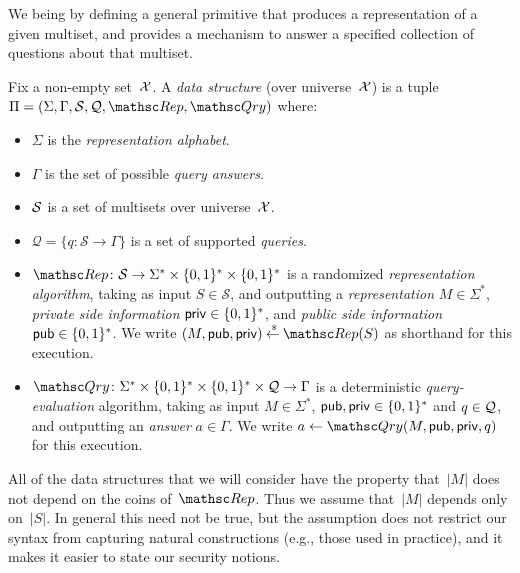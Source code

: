   We being by defining a general primitive
that produces a representation of a given multiset, and provides a
mechanism to answer a specified collection of questions about that
multiset. 
\begin{definition} \rm
Fix a non-empty set~${\cal X}$. A \emph{data structure} (over universe~${\cal X}$)
is a tuple $\setprim=(\Sigma,\Gamma,\calS,\calQ,\Rep, \Qry)$ where:
\begin{itemize}
\item $\Sigma$ is the \emph{representation alphabet}.
\item $\Gamma$ is the set of possible \emph{query answers}.
\item ${\cal S}$ is a set  of multisets over universe~${\cal X}$.
\item $\mathcal{Q}=\{q \colon \mathcal{S} \to \Gamma\}$ is a set
    of supported \emph{queries}.
\item $\Rep \colon \mathcal{S} \to \Sigma^* \times \bits^*
    \times \bits^*$ is a randomized \emph{representation
    algorithm}, taking as input $S \in \mathcal{S}$, and
    outputting a \emph{representation} $M \in \Sigma^*$,
    \emph{private side information} ${\sf priv} \in \{0,1\}^*$, and
    \emph{public side information} ${\sf pub} \in \{0,1\}^*$.  We write
    $(M,\pubaux,\privaux) \getsr \Rep(S)$ as shorthand for this execution.
\item $\Qry\colon \Sigma^* \times \bits^* \times \bits^* \times \calQ \to
    \Gamma$ is a deterministic \emph{query-evaluation}
    algorithm, taking as input $M\in\Sigma^*$, ${\sf pub},{\sf priv} \in
    \{0,1\}^*$ and $q \in {\cal Q}$, and outputting
    an \emph{answer} $a \in \Gamma$.  We write $a \gets
    \Qry(M,\pubaux,\privaux,q)$ for this execution.
\end{itemize}
\hfill\dqed
\end{definition}
All of the data structures that
we will consider have the property that~$|M|$ does not depend on the
coins of~$\Rep$. Thus we assume that~$|M|$ depends only on~$|S|$. In
general this need not be true, but the assumption does not restrict
our syntax from capturing natural constructions (e.g., those used in
practice), and it makes it easier to state our security notions.

